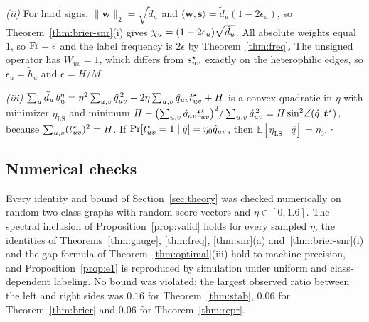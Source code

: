 \emph{(ii)} For hard signs, $\|\bm w\|_2=\sqrt{\tilde d_u}$ and $\langle\bm w,\bm s\rangle=\tilde d_u(1-2\epsilon_u)$, so Theorem~\ref{thm:brier-snr}(i) gives $\chi_u=(1-2\epsilon_u)\sqrt{\tilde d_u}$.
All absolute weights equal $1$, so $\operatorname{Fr}=\epsilon$ and the label frequency is $2\epsilon$ by Theorem~\ref{thm:freq}.
The unsigned operator has $W_{uv}=1$, which differs from $s^{\star}_{uv}$ exactly on the heterophilic edges, so $\epsilon_u=\tilde h_u$ and $\epsilon=H/M$.

\emph{(iii)} $\sum_u\tilde d_u\,b^{\eta}_u=\eta^2\sum_{u,v}\hat q_{uv}^{\,2}-2\eta\sum_{u,v}\hat q_{uv}t^{\star}_{uv}+H$ is a convex quadratic in $\eta$ with minimizer $\eta_{\mathrm{LS}}$ and minimum $H-\bigl(\sum_{u,v}\hat q_{uv}t^{\star}_{uv}\bigr)^2/\sum_{u,v}\hat q_{uv}^{\,2}=H\sin^2\!\angle(\hat q,\bm t^\star)$, because $\sum_{u,v}(t^{\star}_{uv})^2=H$.
If $\Pr[t^{\star}_{uv}=1\mid\hat q]=\eta_0\hat q_{uv}$, then $\mathbb E[\eta_{\mathrm{LS}}\mid\hat q]=\eta_0$.
\hfill$\square$

\subsection{Numerical checks}\label{app:numerical}
Every identity and bound of Section~\ref{sec:theory} was checked numerically on random two-class graphs with random score vectors and $\eta\in[0,1.6]$.
The spectral inclusion of Proposition~\ref{prop:valid} holds for every sampled $\eta$, the identities of Theorems~\ref{thm:gauge}, \ref{thm:freq}, \ref{thm:snr}(a) and~\ref{thm:brier-snr}(i) and the gap formula of Theorem~\ref{thm:optimal}(iii) hold to machine precision, and Proposition~\ref{prop:e1} is reproduced by simulation under uniform and class-dependent labeling.
No bound was violated; the largest observed ratio between the left and right sides was $0.16$ for Theorem~\ref{thm:stab}, $0.06$ for Theorem~\ref{thm:brier} and $0.06$ for Theorem~\ref{thm:repr}.
